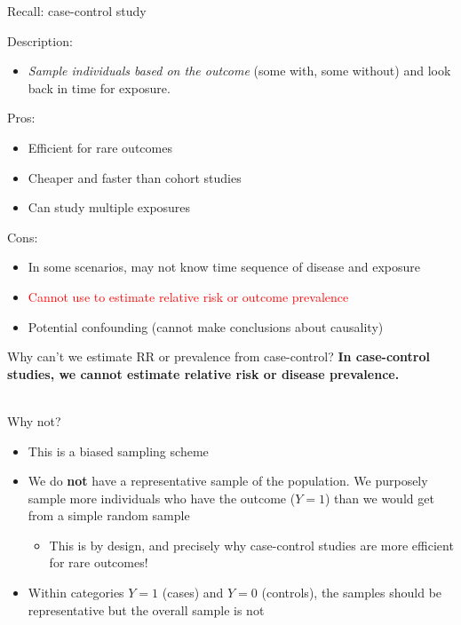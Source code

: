 \documentclass[10pt,t]{beamer}
\begin{document}
\begin{frame}{Recall: case-control study}
	\vspace{-5 mm}
	
	Description:
	\begin{itemize}
		\item \textit{Sample individuals based on the outcome} (some with, some without) and look back in time for exposure. 
	\end{itemize} 
\medskip
	Pros: 
	\begin{itemize}
		\item Efficient for rare outcomes 
		\item Cheaper and faster than cohort studies 
		\item Can study multiple exposures 
	\end{itemize}
	\medskip
	Cons: 
	\begin{itemize}
		\item In some scenarios, may not know time sequence of disease and exposure 
		\item \textcolor{red}{Cannot use to estimate relative risk or outcome prevalence} 
		\item Potential confounding (cannot make conclusions about causality)
	\end{itemize}
\end{frame}

\begin{frame}{Why can't we estimate RR or prevalence from case-control?}
	\textbf{In case-control studies, we cannot estimate relative risk or disease prevalence.}
	\\ ~\
	
	Why not? 
	\medskip
	
	\begin{itemize}
		\item This is a biased sampling scheme
		\medskip
		
		\item We do \textbf{not} have a representative sample of the population. We purposely sample more individuals who have the outcome ($Y = 1$) than we would 
		get from a simple random sample
		\medskip
			\begin{itemize}
				\item This is by design, and precisely why case-control studies are more efficient for rare outcomes!
			\end{itemize}
		
		\medskip
		
		\item Within categories $Y = 1$ (cases) and $Y = 0$ (controls), the samples should be representative but the overall sample is not
	\end{itemize} 
\end{frame}
\end{document}
